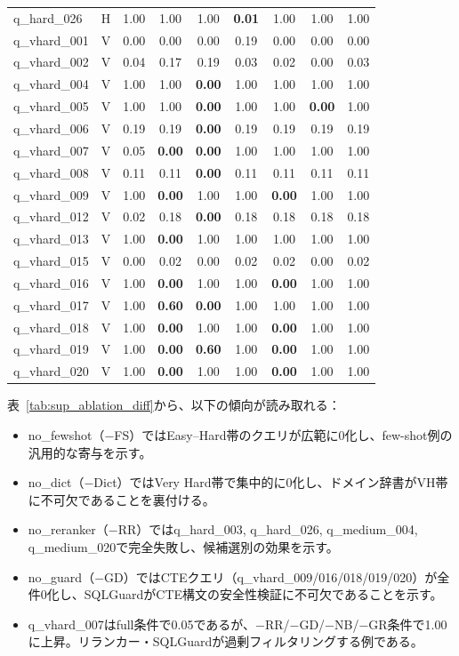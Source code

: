 \documentclass[5p,twocolumn]{elsarticle}
\begin{document}
\begin{table}[htbp]
\begin{tabular}{@{}llccccccc@{}}
    q\_hard\_026 & H & 1.00 & 1.00 & 1.00 & \textbf{0.01} & 1.00 & 1.00 & 1.00 \\
    q\_vhard\_001 & V & 0.00 & 0.00 & 0.00 & 0.19 & 0.00 & 0.00 & 0.00 \\
    q\_vhard\_002 & V & 0.04 & 0.17 & 0.19 & 0.03 & 0.02 & 0.00 & 0.03 \\
    q\_vhard\_004 & V & 1.00 & 1.00 & \textbf{0.00} & 1.00 & 1.00 & 1.00 & 1.00 \\
    q\_vhard\_005 & V & 1.00 & 1.00 & \textbf{0.00} & 1.00 & 1.00 & \textbf{0.00} & 1.00 \\
    q\_vhard\_006 & V & 0.19 & 0.19 & \textbf{0.00} & 0.19 & 0.19 & 0.19 & 0.19 \\
    q\_vhard\_007 & V & 0.05 & \textbf{0.00} & \textbf{0.00} & 1.00 & 1.00 & 1.00 & 1.00 \\
    q\_vhard\_008 & V & 0.11 & 0.11 & \textbf{0.00} & 0.11 & 0.11 & 0.11 & 0.11 \\
    q\_vhard\_009 & V & 1.00 & \textbf{0.00} & 1.00 & 1.00 & \textbf{0.00} & 1.00 & 1.00 \\
    q\_vhard\_012 & V & 0.02 & 0.18 & \textbf{0.00} & 0.18 & 0.18 & 0.18 & 0.18 \\
    q\_vhard\_013 & V & 1.00 & \textbf{0.00} & 1.00 & 1.00 & 1.00 & 1.00 & 1.00 \\
    q\_vhard\_015 & V & 0.00 & 0.02 & 0.00 & 0.02 & 0.02 & 0.00 & 0.02 \\
    q\_vhard\_016 & V & 1.00 & \textbf{0.00} & 1.00 & 1.00 & \textbf{0.00} & 1.00 & 1.00 \\
    q\_vhard\_017 & V & 1.00 & \textbf{0.60} & \textbf{0.00} & 1.00 & 1.00 & 1.00 & 1.00 \\
    q\_vhard\_018 & V & 1.00 & \textbf{0.00} & 1.00 & 1.00 & \textbf{0.00} & 1.00 & 1.00 \\
    q\_vhard\_019 & V & 1.00 & \textbf{0.00} & \textbf{0.60} & 1.00 & \textbf{0.00} & 1.00 & 1.00 \\
    q\_vhard\_020 & V & 1.00 & \textbf{0.00} & 1.00 & 1.00 & \textbf{0.00} & 1.00 & 1.00 \\
  \bottomrule
\end{tabular}
\end{table}

表~\ref{tab:sup_ablation_diff}から、以下の傾向が読み取れる：
\begin{itemize}
  \item no\_fewshot（$-$FS）ではEasy--Hard帯のクエリが広範に0化し、few-shot例の汎用的な寄与を示す。
  \item no\_dict（$-$Dict）ではVery Hard帯で集中的に0化し、ドメイン辞書がVH帯に不可欠であることを裏付ける。
  \item no\_reranker（$-$RR）ではq\_hard\_003, q\_hard\_026, q\_medium\_004, q\_medium\_020で完全失敗し、候補選別の効果を示す。
  \item no\_guard（$-$GD）ではCTEクエリ（q\_vhard\_009/016/018/019/020）が全件0化し、SQLGuardがCTE構文の安全性検証に不可欠であることを示す。
  \item q\_vhard\_007はfull条件で0.05であるが、$-$RR/$-$GD/$-$NB/$-$GR条件で1.00に上昇。リランカー・SQLGuardが過剰フィルタリングする例である。
\end{itemize}
\end{document}
